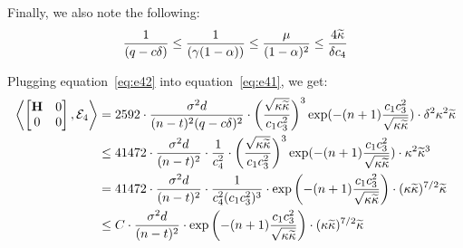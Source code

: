 Finally, we also note the following:
\begin{align*}
\frac{1}{(q-c\delta)}\leq\frac{1}{(\gamma(1-\alpha))}\leq\frac{\mu}{(1-\alpha)^2}\leq\frac{4\widetilde{\kappa}}{\delta c_4}
\end{align*}

Plugging equation~\ref{eq:e42} into equation~\ref{eq:e41}, we get:
\begin{align}
\label{eq:e4}
\left\langle \begin{bmatrix}\mathbf{H}&0\\0&0\end{bmatrix}, \mathcal{E}_4 \right\rangle&=2592\cdot\frac{\sigma^2d}{(n-t)^2(q-c\delta)^2}\cdot\bigg(\frac{\sqrt{{\kappa}\widetilde{\kappa}}}{c_1c_3^2}\bigg)^3\exp({-(n+1)\frac{c_1c_3^2}{\sqrt{{\kappa}\widetilde{\kappa}}}})\cdot\delta^2{\kappa}^2\widetilde{\kappa}\nonumber\\
&\leq41472\cdot\frac{\sigma^2d}{(n-t)^2}\cdot\frac{1}{c_4^2}\cdot\bigg(\frac{\sqrt{{\kappa}\widetilde{\kappa}}}{c_1c_3^2}\bigg)^3\exp({-(n+1)\frac{c_1c_3^2}{\sqrt{{\kappa}\widetilde{\kappa}}}})\cdot{\kappa}^2\widetilde{\kappa}^3\nonumber\nonumber\\
&=41472\cdot\frac{\sigma^2d}{(n-t)^2}\cdot\frac{1}{c_4^2(c_1c_3^2)^3}\cdot\exp\bigg({-(n+1)\frac{c_1c_3^2}{\sqrt{{\kappa}\widetilde{\kappa}}}}\bigg)\cdot({\kappa}\widetilde{\kappa})^{7/2}\widetilde{\kappa}\nonumber\\
&\leq C\cdot\frac{\sigma^2d}{(n-t)^2}\cdot\exp\bigg({-(n+1)\frac{c_1c_3^2}{\sqrt{{\kappa}\widetilde{\kappa}}}}\bigg)\cdot({\kappa}\widetilde{\kappa})^{7/2}\widetilde{\kappa}
\end{align}

